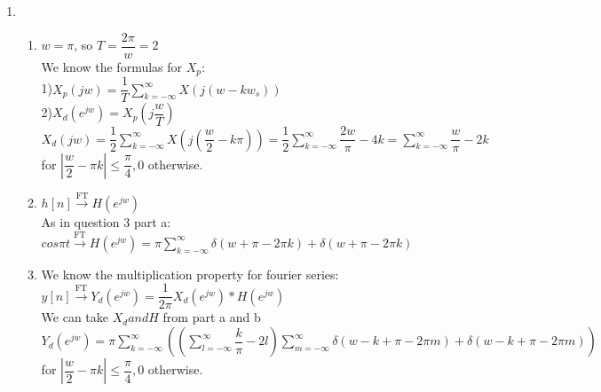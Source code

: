 \documentclass[10pt,a4paper, margin=1in]{article}
\begin{document}
\begin{enumerate}
\item 
    \begin{enumerate}
    \item %
    $w=\pi$, so $T=\dfrac{2\pi}{w} = 2$\\
    We know the formulas for $X_p$:\\
    
    1)$X_p(jw) = \dfrac{1}{T}\sum_{k=-\infty}^{\infty} X(j(w-kw_s))$\\
    
    2)$X_d(e^{jw}) = X_p(j\dfrac{w}{T})$\\
    
$X_d(jw) = \dfrac{1}{2}\sum_{k=-\infty}^{\infty} X(j(\dfrac{w}{2}-k\pi)) = \dfrac{1}{2}\sum_{k=-\infty}^{\infty} \dfrac{2w}{\pi}-4k =\sum_{k=-\infty}^{\infty} \dfrac{w}{\pi}-2k$\\

for $|\dfrac{w}{2}-\pi k| \leq \dfrac{\pi}{4}, 0$ otherwise.
    \item %
    $h[n] \xrightarrow{\text{FT}} H(e^{jw})$\\
    
     As in question 3 part a:\\
     
     $cos \pi t \xrightarrow{\text{FT}} H(e^{jw})=\pi \sum_{k=-\infty}^{\infty}{\delta(w+ \pi -2\pi k)+\delta(w+\pi -2\pi k)}$
    \item %
    We know the multiplication property for fourier series:\\
    $y[n] \xrightarrow{\text{FT}} Y_d(e^{jw}) = \dfrac{1}{2\pi} X_d(e^{jw})*H(e^{jw})$\\
    
    We can take $X_d and H$ from part a and b\\
    
    $Y_d(e^{jw}) = \pi \sum_{k=-\infty}^{\infty} ((\sum_{l=-\infty}^{\infty} \dfrac{k}{\pi}-2l) \sum_{m=-\infty}^{\infty}{\delta(w-k+ \pi -2\pi m)+\delta(w-k+\pi -2\pi m)})$\\
    
    for $|\dfrac{w}{2}-\pi k| \leq \dfrac{\pi}{4}, 0$ otherwise.
    \end{enumerate}



\end{enumerate}
\end{document}
